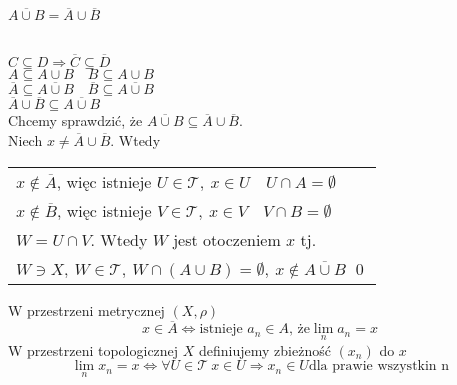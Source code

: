 \begin{tw} 
    $\overline{A \cup B} = \overline A \cup \overline B$
\end{tw} 
\begin{dd} ~\\
    $C \subseteq D \Rightarrow \overline C \subseteq \overline D$ \\ 
    $A \subseteq A \cup B \quad B \subseteq A \cup B$ \\ 
    $\overline A \subseteq \overline{A \cup B} \quad \overline B \subseteq \overline{A \cup B}$ \\ 
    $\overline A \cup \overline B \subseteq \overline{A \cup B}$ \\ 
    Chcemy sprawdzić, że $\overline{A \cup B} \subseteq \overline A \cup \overline B$. \\ 
    Niech $x \neq \overline A \cup \overline B$. Wtedy
    \begin{tabular}[t]{l} 
    $x \notin \overline A$, więc istnieje $U \in \mathcal T,\ x \in U \quad U \cap A = \emptyset$ \\ 
    $x \notin \overline B$, więc istnieje $V \in \mathcal T,\ x \in V \quad V \cap B = \emptyset$ \\ 
    $W = U \cap V$. Wtedy $W$ jest otoczeniem $x$ tj. \\ 
    $W \ni X, \ W \in \mathcal T, \ W \cap (A \cup B) = \emptyset,
    \ x \notin \overline{A \cup B}$
    \hfill \qed
    \end{tabular}
\end{dd} 
\begin{przyp} 
    W przestrzeni metrycznej $(X,\rho)$ 
    \[ x \in \overline A \Leftrightarrow \text{istnieje } a_n \in A \text{, że} \lim_n a_n = x \]
    W przestrzeni topologicznej $X$ definiujemy zbieżność $(x_n)$ do $x$ 
    \[ \lim_n x_n = x \Leftrightarrow \forall U \in \mathcal T \ x \in U \Rightarrow x_n \in U \text{dla prawie 
    wszystkin n}\]
\end{przyp} 
